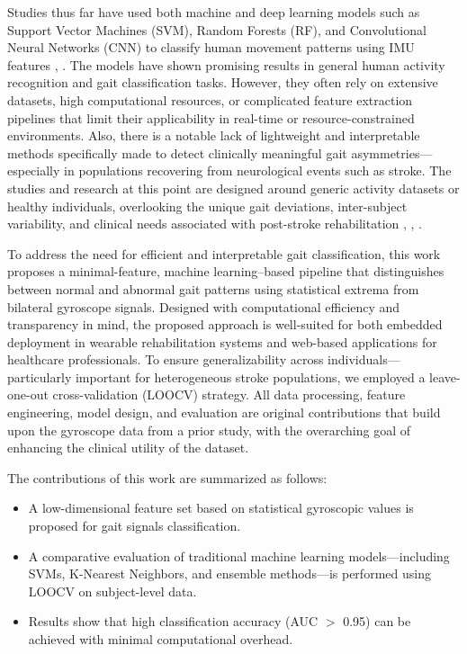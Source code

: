 Studies thus far have used both machine and deep learning models such as Support Vector Machines (SVM), Random Forests (RF), and Convolutional 
Neural Networks (CNN) to classify human movement patterns using IMU features \cite{ref15}, \cite{ref16}. The models have shown promising results in general 
human activity recognition and gait classification tasks. However, they often rely on extensive datasets, high computational resources, or 
complicated feature extraction pipelines that limit their applicability in real-time or resource-constrained environments. Also, there is 
a notable lack of lightweight and interpretable methods specifically made to detect clinically meaningful gait asymmetries—especially in 
populations recovering from neurological events such as stroke. The studies and research at this point are designed around generic activity datasets 
or healthy individuals, overlooking the unique gait deviations, inter-subject variability, and clinical needs associated with post-stroke 
rehabilitation \cite{ref17}, \cite{ref18}, \cite{ref19}. 

To address the need for efficient and interpretable gait classification, this work proposes a minimal-feature, machine learning–based pipeline that distinguishes 
between normal and abnormal gait patterns using statistical extrema from bilateral gyroscope signals. Designed with computational efficiency and transparency 
in mind, the proposed approach is well-suited for both embedded deployment in wearable rehabilitation systems and web-based applications for healthcare professionals. 
To ensure generalizability across individuals—particularly important for heterogeneous stroke populations, we employed a leave-one-out cross-validation (LOOCV) 
strategy. All data processing, feature engineering, model design, and evaluation are original contributions that build upon the gyroscope data from a prior study, 
with the overarching goal of enhancing the clinical utility of the dataset.

The contributions of this work are summarized as follows:
\begin{itemize}
    \item A low-dimensional feature set based on statistical gyroscopic values is proposed for gait signals classification.
    \item A comparative evaluation of traditional machine learning models—including SVMs, K-Nearest Neighbors, and ensemble methods—is performed using LOOCV 
    on subject-level data.
    \item Results show that high classification accuracy (AUC $>$ 0.95) can be achieved with minimal computational overhead.
\end{itemize}

